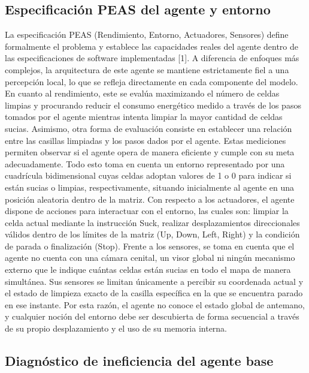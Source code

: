 \documentclass[
  spanish,
  spanish,
  es-tabla,
  twocolumn]{llncs}
\begin{document}
\subsection{Especificación PEAS del agente y
entorno}\label{especificaciuxf3n-peas-del-agente-y-entorno}

La especificación PEAS (Rendimiento, Entorno, Actuadores, Sensores)
define formalmente el problema y establece las capacidades reales del
agente dentro de las especificaciones de software implementadas {[}1{]}.
A diferencia de enfoques más complejos, la arquitectura de este agente
se mantiene estrictamente fiel a una percepción local, lo que se refleja
directamente en cada componente del modelo. En cuanto al rendimiento,
este se evalúa maximizando el número de celdas limpias y procurando
reducir el consumo energético medido a través de los pasos tomados por
el agente mientras intenta limpiar la mayor cantidad de celdas sucias.
Asimismo, otra forma de evaluación consiste en establecer una relación
entre las casillas limpiadas y los pasos dados por el agente. Estas
mediciones permiten observar si el agente opera de manera eficiente y
cumple con su meta adecuadamente. Todo esto toma en cuenta un entorno
representado por una cuadrícula bidimensional cuyas celdas adoptan
valores de 1 o 0 para indicar si están sucias o limpias,
respectivamente, situando inicialmente al agente en una posición
aleatoria dentro de la matriz. Con respecto a los actuadores, el agente
dispone de acciones para interactuar con el entorno, las cuales son:
limpiar la celda actual mediante la instrucción Suck, realizar
desplazamientos direccionales válidos dentro de los límites de la matriz
(Up, Down, Left, Right) y la condición de parada o finalización (Stop).
Frente a los sensores, se toma en cuenta que el agente no cuenta con una
cámara cenital, un visor global ni ningún mecanismo externo que le
indique cuántas celdas están sucias en todo el mapa de manera
simultánea. Sus sensores se limitan únicamente a percibir su coordenada
actual y el estado de limpieza exacto de la casilla específica en la que
se encuentra parado en ese instante. Por esta razón, el agente no conoce
el estado global de antemano, y cualquier noción del entorno debe ser
descubierta de forma secuencial a través de su propio desplazamiento y
el uso de su memoria interna.

\subsection{Diagnóstico de ineficiencia del agente
base}\label{diagnuxf3stico-de-ineficiencia-del-agente-base}
\end{document}
